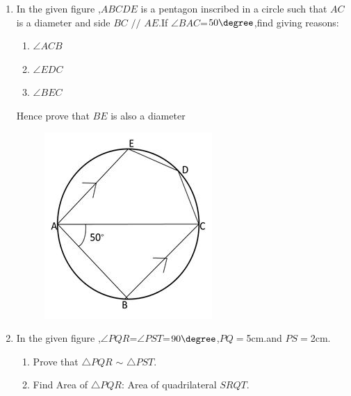 \begin{enumerate}
\item In the given figure ,$ABCDE$ is a pentagon inscribed in a circle such that $AC$ is a diameter and side $BC$ $\slash \slash$ $ AE $.If $\angle  BAC $=$50\degree$,find giving reasons:
\begin{enumerate}
    \item $\angle ACB$
    \item $\angle EDC$
    \item $\angle BEC$
\end{enumerate}
\text Hence prove that $BE$ is also a diameter
\begin{figure}[!ht]
		\centering
		\includegraphics[width=\columnwidth]{figs/icse4.jpg}
		\caption{}
		\label{fig:enter-label}
\end{figure}

\item In the given figure ,$\angle{PQR}$=$\angle{PST}$=$ 90\degree$,$PQ=$5$\mathrm{cm}$.and $PS=$2$\mathrm{cm}$.
\begin{enumerate}
    \item Prove that $\triangle{PQR}$  $\sim$   $\triangle{PST}$.
    \item Find Area of $\triangle{PQR}$: Area of quadrilateral $SRQT$.
\end{enumerate}


\end{enumerate}
